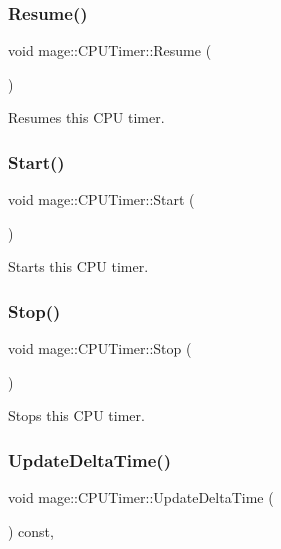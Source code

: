 \subsubsection{\texorpdfstring{Resume()}{Resume()}}
{\footnotesize\ttfamily void mage\+::\+C\+P\+U\+Timer\+::\+Resume (\begin{DoxyParamCaption}{ }\end{DoxyParamCaption})\hspace{0.3cm}{\ttfamily [noexcept]}}

Resumes this C\+PU timer. \hypertarget{classmage_1_1_c_p_u_timer_abcb6e468bad9fb821c18502b6445b696}{}\label{classmage_1_1_c_p_u_timer_abcb6e468bad9fb821c18502b6445b696} 
\subsubsection{\texorpdfstring{Start()}{Start()}}
{\footnotesize\ttfamily void mage\+::\+C\+P\+U\+Timer\+::\+Start (\begin{DoxyParamCaption}{ }\end{DoxyParamCaption})\hspace{0.3cm}{\ttfamily [noexcept]}}

Starts this C\+PU timer. \hypertarget{classmage_1_1_c_p_u_timer_ae2fa5b36f436fd160d7f5b91783c0f11}{}\label{classmage_1_1_c_p_u_timer_ae2fa5b36f436fd160d7f5b91783c0f11} 
\subsubsection{\texorpdfstring{Stop()}{Stop()}}
{\footnotesize\ttfamily void mage\+::\+C\+P\+U\+Timer\+::\+Stop (\begin{DoxyParamCaption}{ }\end{DoxyParamCaption})\hspace{0.3cm}{\ttfamily [noexcept]}}

Stops this C\+PU timer. \hypertarget{classmage_1_1_c_p_u_timer_a4e82f7003a11e109495b7450e2f82f4f}{}\label{classmage_1_1_c_p_u_timer_a4e82f7003a11e109495b7450e2f82f4f} 
\subsubsection{\texorpdfstring{Update\+Delta\+Time()}{UpdateDeltaTime()}}
{\footnotesize\ttfamily void mage\+::\+C\+P\+U\+Timer\+::\+Update\+Delta\+Time (\begin{DoxyParamCaption}{ }\end{DoxyParamCaption}) const\hspace{0.3cm}{\ttfamily [private]}, {\ttfamily [noexcept]}}

